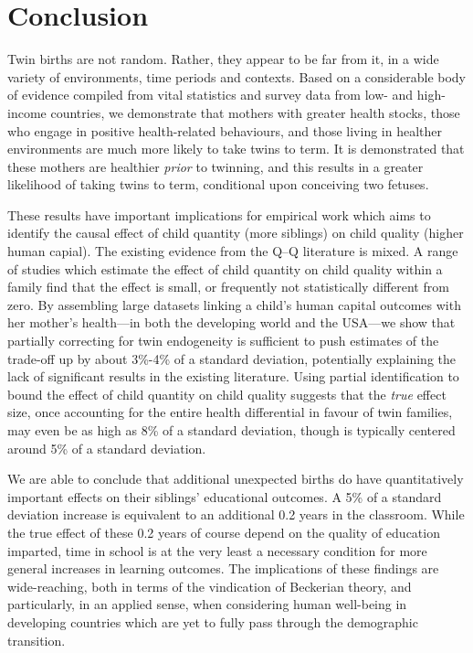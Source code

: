 \section{Conclusion}                               \label{TWINscn:conclusion}
Twin births are not random.  Rather, they appear to be far from it, in a wide
variety of environments, time periods and contexts.  Based on a considerable 
body of evidence compiled from vital statistics and survey data from low- and 
high-income countries, we demonstrate that mothers with greater health stocks,
those who engage in positive health-related behaviours, and those living in 
healther environments are much more likely to take twins to term.  It is 
demonstrated that these mothers are healthier \emph{prior} to twinning, and
this results in a greater likelihood of taking twins to term, conditional upon
conceiving two fetuses.

These results have important implications for empirical work which aims to 
identify the causal effect of child quantity (more siblings) on child quality
(higher human capial).  The existing evidence from the Q--Q literature is 
mixed.  A range of studies which estimate the effect of child quantity on child 
quality within a family find that the effect is small, or frequently not 
statistically different from zero.  By assembling large datasets linking a 
child's human capital outcomes with her mother's health---in both the developing 
world and the USA---we show that partially correcting for twin endogeneity is 
sufficient to push estimates of the trade-off up by about 3\%-4\% of a standard 
deviation, potentially explaining the lack of significant results in the 
existing literature.  Using partial identification to bound the effect of child 
quantity on child quality suggests that the \emph{true} effect size, once 
accounting for the entire health differential in favour of twin families, may 
even be as high as 8\% of a standard deviation, though is typically centered
around 5\% of a standard deviation.

We are able to conclude that additional unexpected births do have
quantitatively important effects on their siblings' educational outcomes.  
A 5\% of a standard deviation increase is equivalent to an additional 0.2
years in the classroom.  While the true effect of these 0.2 years of course
depend on the quality of education imparted, time in school is at the very 
least a necessary condition for more general increases in learning outcomes.  
The implications of these findings are wide-reaching, both in terms of the 
vindication of Beckerian theory, and particularly, in an applied sense, when 
considering human well-being in developing countries which are yet to fully 
pass through the demographic transition.

